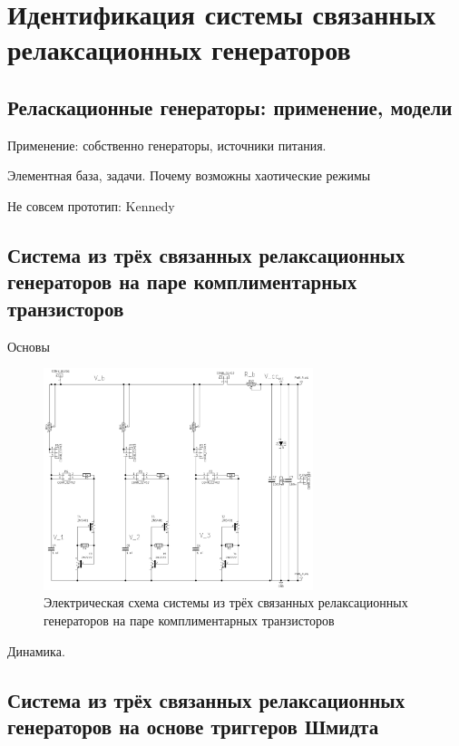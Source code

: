\chapter{Идентификация системы связанных релаксационных генераторов}

\newcommand{\RelaxBjtIi}{системы из трёх связанных релаксационных генераторов на паре комплиментарных транзисторов}
\newcommand{\RelaxShIi}{системы из трёх связанных релаксационных генераторов на основе триггеров Шмидта}

\section{Реласкационные генераторы: применение, модели}

Применение: собственно генераторы, источники питания.

Элементная база, задачи. Почему возможны хаотические режимы

Не совсем прототип: Kennedy


\cite{mishenko_du_small_relax}

\section{Система из трёх связанных релаксационных генераторов на паре комплиментарных транзисторов}
\label{atu:sec:relax3d}

Основы

\begin{figure}[htb!]
  \centerline{\includegraphics[width=0.7\textwidth]{p/relax3d_2bjt_schem.png} }
  \caption{Электрическая схема \RelaxBjtIi}
  \label{atu:f:relax3d_schem}
\end{figure}

Динамика.

\section{Система из трёх связанных релаксационных генераторов на основе триггеров Шмидта}
\label{atu:sec:relax3ds}

